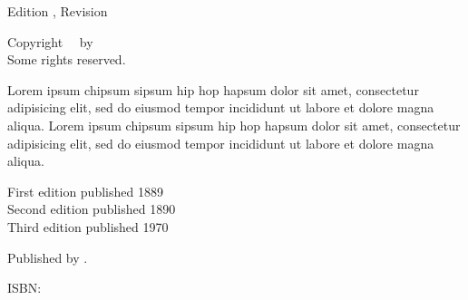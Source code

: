 \clearpage

\begingroup
  \null\vfill\small

  \utitle\par
  Edition \uedition, Revision \urevision\par
  Copyright \textcopyright\ \udate\ by \uauthor\\
  Some rights reserved.\par

  Lorem ipsum chipsum sipsum hip hop hapsum dolor sit amet, consectetur adipisicing elit, sed do eiusmod tempor incididunt ut labore et dolore magna aliqua. Lorem ipsum chipsum sipsum hip hop hapsum dolor sit amet, consectetur adipisicing elit, sed do eiusmod tempor incididunt ut labore et dolore magna aliqua.\par

  First edition published 1889\\
  Second edition published 1890\\
  Third edition published 1970\par
  
  Published by \upublisher.\par
  ISBN: \uisbn\par

  \uwebsite\par
  \vspace*{10mm}
\endgroup

\clearpage
